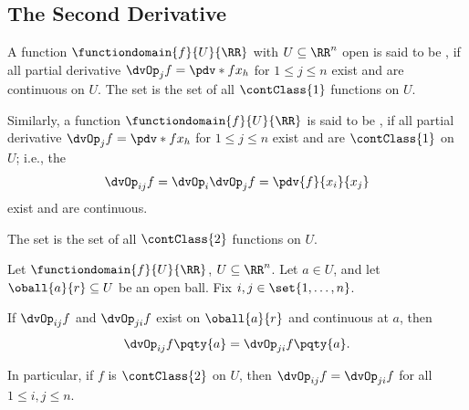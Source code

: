 \subsection{The Second Derivative}

\begin{definition}
    A function \(\functiondomain{f}{U}{\RR}\) with \(U \subseteq \RR^n\) open is said to be , if all partial derivative \(\dvOp_j f = \pdv*{f}{x_h}\) for \(1 \leq j \leq n\) exist and are continuous on \(U\). The set  is the set of all \(\contClass{1}\) functions on \(U\).

    Similarly, a function \(\functiondomain{f}{U}{\RR}\) is said to be , if all partial derivative \(\dvOp_j f = \pdv*{f}{x_h}\) for \(1 \leq j \leq n\) exist and are \(\contClass{1}\) on \(U\); i.e., the 
    \[
        \dvOp_{ij} f = \dvOp_i \dvOp_j f = \pdv{f}{x_i}{x_j}
    \]
    exist and are continuous.
    
    The set  is the set of all \(\contClass{2}\) functions on \(U\).
\end{definition}

\begin{theorem}
    \label{thm:symmetry-of-mixed-partial-derivatives}%
    Let \(\functiondomain{f}{U}{\RR}\), \(U \subseteq \RR^n\). Let \(a \in U\), and let \(\oball{a}{r} \subseteq U\) be an open ball. Fix \(i, j \in \set{1, \ldots, n}\). 
    
    If \(\dvOp_{ij} f\) and \(\dvOp_{ji} f\) exist on \(\oball{a}{r}\) and continuous at \(a\), then
    \[
        \dvOp_{ij} f\pqty{a} = \dvOp_{ji} f\pqty{a}.
    \]
\end{theorem}

\begin{remark}
    In particular, if \(f\) is \(\contClass{2}\) on \(U\), then \(\dvOp_{ij} f = \dvOp_{ji} f\) for all \(1 \leq i, j \leq n\).
\end{remark}

